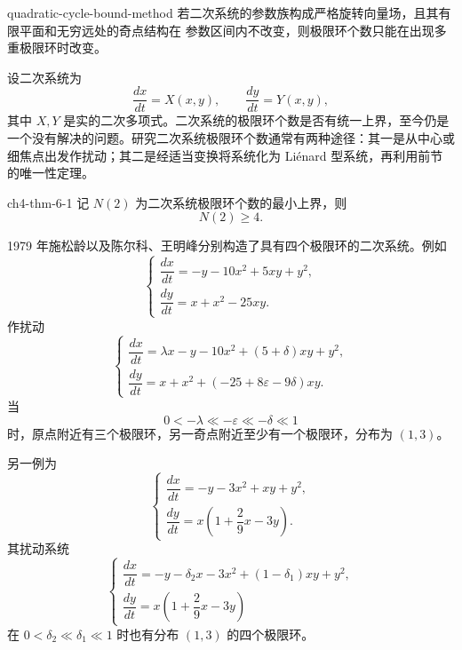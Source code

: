 \begin{theorem}{}{quadratic-cycle-bound-method}
若二次系统的参数族构成严格旋转向量场，且其有限平面和无穷远处的奇点结构在
参数区间内不改变，则极限环个数只能在出现多重极限环时改变。
\end{theorem}

\fi

设二次系统为
\begin{equation}
\dfrac{dx}{dt}=X(x,y),\qquad \dfrac{dy}{dt}=Y(x,y),\tag{6.1}
\end{equation}
其中 \(X,Y\) 是实的二次多项式。二次系统的极限环个数是否有统一上界，至今仍是一个没有解决的问题。研究二次系统极限环个数通常有两种途径：其一是从中心或细焦点出发作扰动；其二是经适当变换将系统化为 Liénard 型系统，再利用前节的唯一性定理。

\begin{theorem}{}{ch4-thm-6-1}
记 \(N(2)\) 为二次系统极限环个数的最小上界，则
\[
N(2)\geqslant4.
\]
\end{theorem}

1979 年施松龄以及陈尔科、王明峰分别构造了具有四个极限环的二次系统。例如
\begin{equation}
\begin{cases}
\dfrac{dx}{dt}=-y-10x^2+5xy+y^2,\\
\dfrac{dy}{dt}=x+x^2-25xy.
\end{cases}\tag{6.2}
\end{equation}
作扰动
\begin{equation}
\begin{cases}
\dfrac{dx}{dt}=\lambda x-y-10x^2+(5+\delta)xy+y^2,\\
\dfrac{dy}{dt}=x+x^2+(-25+8\varepsilon-9\delta)xy.
\end{cases}\tag{6.3}
\end{equation}
当
\[
0<-\lambda\ll-\varepsilon\ll-\delta\ll1
\]
时，原点附近有三个极限环，另一奇点附近至少有一个极限环，分布为 \((1,3)\)。

另一例为
\begin{equation}
\begin{cases}
\dfrac{dx}{dt}=-y-3x^2+xy+y^2,\\
\dfrac{dy}{dt}=x\left(1+\dfrac29x-3y\right).
\end{cases}\tag{6.4}
\end{equation}
其扰动系统
\begin{equation}
\begin{cases}
\dfrac{dx}{dt}=-y-\delta_2x-3x^2+(1-\delta_1)xy+y^2,\\
\dfrac{dy}{dt}=x\left(1+\dfrac29x-3y\right)
\end{cases}\tag{6.5}
\end{equation}
在 \(0<\delta_2\ll\delta_1\ll1\) 时也有分布 \((1,3)\) 的四个极限环。

